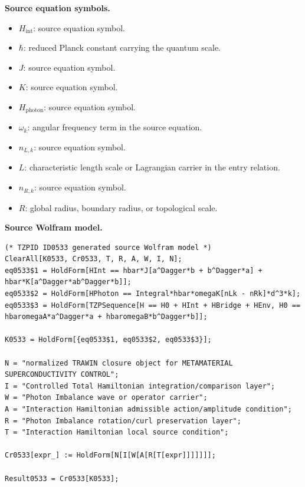 \begin{minipage}[t]{0.49\linewidth}
\begingroup
\small
\raggedright
\textbf{Source equation symbols.}\par
\begin{itemize}[leftmargin=1.35em,itemsep=1pt,topsep=1pt,parsep=0pt]
    \item $H_{\mathrm{int}}$: source equation symbol.
    \item $\hbar$: reduced Planck constant carrying the quantum scale.
    \item $J$: source equation symbol.
    \item $K$: source equation symbol.
    \item $H_{\mathrm{photon}}$: source equation symbol.
    \item $\omega_k$: angular frequency term in the source equation.
    \item $n_{L,k}$: source equation symbol.
    \item $L$: characteristic length scale or Lagrangian carrier in the entry relation.
    \item $n_{R,k}$: source equation symbol.
    \item $R$: global radius, boundary radius, or topological scale.
\end{itemize}
\endgroup
\end{minipage}\hfill
\begin{minipage}[t]{0.47\linewidth}
\begingroup
\scriptsize
\raggedright
\textbf{Source Wolfram model.}\par
\begin{Verbatim}[fontsize=\tiny,breaklines=true,breakanywhere=true]
(* TZPID ID0533 generated source Wolfram model *)
ClearAll[K0533, Cr0533, T, R, A, W, I, N];
eq0533$1 = HoldForm[HInt == hbar*J[a^Dagger*b + b^Dagger*a] + hbar*K[a^Dagger*ab^Dagger*b]];
eq0533$2 = HoldForm[HPhoton == Integral*hbar*omegaK[nLk - nRk]*d^3*k];
eq0533$3 = HoldForm[TZPSequence[H == H0 + HInt + HBridge + HEnv, H0 == hbaromegaA*a^Dagger*a + hbaromegaB*b^Dagger*b]];

K0533 = HoldForm[{eq0533$1, eq0533$2, eq0533$3}];

N = "normalized TRAWIN closure object for METAMATERIAL SUPERCONDUCTIVITY CONTROL";
I = "Controlled Total Hamiltonian integration/comparison layer";
W = "Photon Imbalance wave or operator carrier";
A = "Interaction Hamiltonian admissible action/amplitude condition";
R = "Photon Imbalance rotation/curl preservation layer";
T = "Interaction Hamiltonian local source condition";

Cr0533[expr_] := HoldForm[N[I[W[A[R[T[expr]]]]]]];

Result0533 = Cr0533[K0533];
\end{Verbatim}
\endgroup
\end{minipage}


